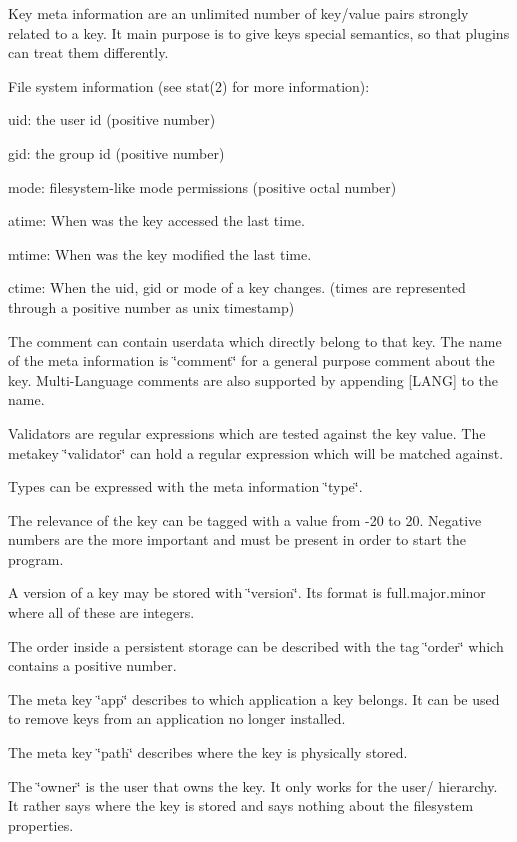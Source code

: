 Key meta information are an unlimited number of key/value pairs strongly related to a key. It main purpose is to give keys special semantics, so that plugins can treat them differently.

File system information (see stat(2) for more information):
\begin{DoxyItemize}
\item uid: the user id (positive number)
\item gid: the group id (positive number)
\item mode: filesystem-\/like mode permissions (positive octal number)
\item atime: When was the key accessed the last time.
\item mtime: When was the key modified the last time.
\item ctime: When the uid, gid or mode of a key changes. (times are represented through a positive number as unix timestamp)
\end{DoxyItemize}

The comment can contain userdata which directly belong to that key. The name of the meta information is \char`\"{}comment\char`\"{} for a general purpose comment about the key. Multi-\/Language comments are also supported by appending \mbox{[}LANG\mbox{]} to the name.

Validators are regular expressions which are tested against the key value. The metakey \char`\"{}validator\char`\"{} can hold a regular expression which will be matched against.

Types can be expressed with the meta information \char`\"{}type\char`\"{}.

The relevance of the key can be tagged with a value from -\/20 to 20. Negative numbers are the more important and must be present in order to start the program.

A version of a key may be stored with \char`\"{}version\char`\"{}. Its format is full.major.minor where all of these are integers.

The order inside a persistent storage can be described with the tag \char`\"{}order\char`\"{} which contains a positive number.

The meta key \char`\"{}app\char`\"{} describes to which application a key belongs. It can be used to remove keys from an application no longer installed.

The meta key \char`\"{}path\char`\"{} describes where the key is physically stored.

The \char`\"{}owner\char`\"{} is the user that owns the key. It only works for the user/ hierarchy. It rather says where the key is stored and says nothing about the filesystem properties. 

